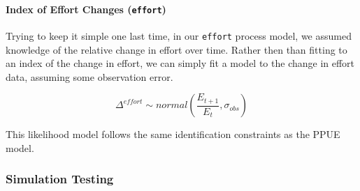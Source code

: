 \documentclass[twoside,12pt,final]{ucthesis-CA2012}
\begin{document}
\begin{ucmainmatter}
\paragraph{\texorpdfstring{Index of Effort Changes
(\texttt{effort})}{Index of Effort Changes (effort)}}\label{index-of-effort-changes-effort}

Trying to keep it simple one last time, in our \texttt{effort} process
model, we assumed knowledge of the relative change in effort over time.
Rather then than fitting to an index of the change in effort, we can
simply fit a model to the change in effort data, assuming some
observation error.

\[\Delta^{effort} \sim normal(\frac{E_{t+1}}{E_{t}}, \sigma_{obs})\]

This likelihood model follows the same identification constraints as the
PPUE model.

\subsubsection{Simulation Testing}\label{simulation-testing}


\end{ucmainmatter}
\end{document}
